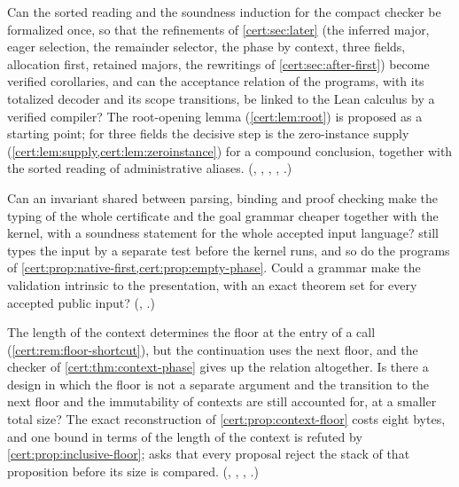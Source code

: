 \begin{question}
Can the sorted reading and the soundness induction for the compact checker be
formalized once, so that the refinements of \cref{cert:sec:later} (the
inferred major, eager selection, the remainder selector, the phase by
context, three fields, allocation first, retained majors, the rewritings of
\cref{cert:sec:after-first}) become verified corollaries, and can
the acceptance relation of the programs, with its totalized decoder and its
scope transitions, be linked to the Lean calculus by a verified compiler? The
root-opening lemma (\cref{cert:lem:root}) is proposed as a starting point;
for three fields the decisive step is the zero-instance supply
(\cref{cert:lem:supply,cert:lem:zeroinstance}) for a compound conclusion,
together with the sorted reading of administrative aliases.
(, ,
, , .)
\end{question}

\begin{question}
Can an invariant shared between parsing, binding and proof checking make the
typing of the whole certificate and the goal grammar cheaper together with
the kernel, with a soundness statement for the whole accepted input language?
 still types the input by a separate test before
the kernel runs, and so do the programs of
\cref{cert:prop:native-first,cert:prop:empty-phase}. Could a grammar make the
validation intrinsic to the presentation, with an exact theorem set for every
accepted public input? (, .)
\end{question}

\begin{question}
The length of the context determines the floor at the entry of a call
(\cref{cert:rem:floor-shortcut}), but the continuation uses the next floor,
and the checker of \cref{cert:thm:context-phase} gives up the relation
altogether. Is there a design in which the floor is not a separate argument
and the transition to the next floor and the immutability of contexts are
still accounted for, at a smaller total size? The exact reconstruction of
\cref{cert:prop:context-floor} costs eight bytes, and one bound in terms of
the length of the context is refuted by \cref{cert:prop:inclusive-floor};
 asks that every proposal reject the stack of that
proposition before its size is compared. (,
, , .)
\end{question}

